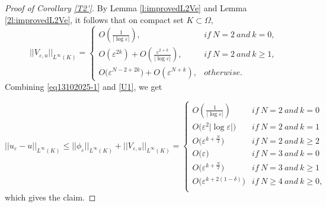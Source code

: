 \documentclass[11pt,reqno]{article}
\numberwithin{equation}{section}
\newcommand\e\varepsilon
\begin{document}
	\begin{proof}[Proof of Corollary \ref{T2'}]
		 By Lemma \ref{l:improvedL2Ve} and Lemma \ref{2l:improvedL2Ve}, it follows that on compact set $K\subset \Omega$,
        \begin{equation}\label{eq13102025-1}
            ||V_{\e,u}||_{L^\infty(K)}= \begin{cases}
          \displaystyle  O\left(\frac{1}{|\log\e|}\right),\quad& if  \ N=2  \ and\ k=0,\\
          \displaystyle O\left(\e^{2k}\right)+O\left(\frac{\e^{2+k}}{|\log\e|}\right),&if\ N=2\ and\ k\ge 1,\\
           \displaystyle     O\big( \e^{N-2+2k}\big)+O\left(\e^{N+k}\right), & otherwise.
            \end{cases}
        \end{equation}
        Combining \eqref{eq13102025-1} and \eqref{U1},  we get

			\begin{equation*}
				||u_\e-u||_{L^\infty(K)}\le||\phi_\e||_{L^\infty(K)}+||V_{\e,u}||_{L^\infty(K)}=
				\begin{cases}
                O\left(\frac{1}{|\log\e|}\right)\quad& if  \ N=2  \ and\ k=0\\
                O\big(\e^2|\log\e|\big) & if  \ N=2  \ and\ k=1\\
                O\big(\e^{k+\frac{N}{2}}\big) & if  \ N=2  \ and\ k\ge 2\\
                O\big(\e\big) & if  \ N=3  \ and\ k=0\\
                O\big(\e^{k+\frac{N}{2}}\big) & if  \ N=3  \ and\ k\ge 1\\
                 O\big(\e^{k+ 2(1-\delta)}\big) & if  \ N\ge 4  \ and\ k\ge 0,\\
            \end{cases}
			\end{equation*}
		which gives the claim.
	\end{proof}
\end{document}
